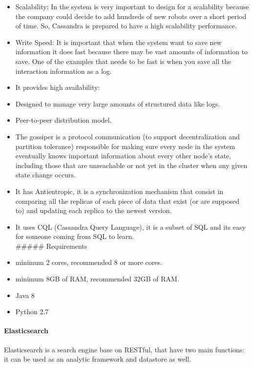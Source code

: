 \documentclass[]{article}
\let\oldparagraph\paragraph
\renewcommand{\paragraph}[1]{\oldparagraph{#1}\mbox{}}
\begin{document}
\begin{itemize}
\item
  Scalability: In the system is very important to design for a
  scalability because the company could decide to add hundreds of new
  robots over a short period of time. So, Cassandra is prepared to have
  a high scalability performance.
\item
  Write Speed: It is important that when the system want to save new
  information it does fast because there may be vast amounts of
  information to save. One of the examples that needs to be fast is when
  you save all the interaction information as a log.
\item
  It provides high availability:
\item
  Designed to manage very large amounts of structured data like logs.
\item
  Peer-to-peer distribution model.
\item
  The gossiper is a protocol communication (to support decentralization
  and partition tolerance) responsible for making sure every node in the
  system eventually knows important information about every other node's
  state, including those that are unreachable or not yet in the cluster
  when any given state change occurs.
\item
  It has Antientropic, it is a synchronization mechanism that consist in
  comparing all the replicas of each piece of data that exist (or are
  supposed to) and updating each replica to the newest version.
\item
  It uses CQL (Cassandra Query Language), it is a subset of SQL and its
  easy for someone coming from SQL to learn.\\
  \#\#\#\#\# Requirements
\item
  minimum 2 cores, recommended 8 or more cores.
\item
  minimum 8GB of RAM, recommended 32GB of RAM.
\item
  Java 8
\item
  Python 2.7
\end{itemize}

\hypertarget{elasticsearch}{%
\paragraph{Elasticsearch}\label{elasticsearch}}

Elasticsearch is a search engine base on RESTful, that have two main
functions: it can be used as an analytic framework and datastore as
well.
\end{document}

